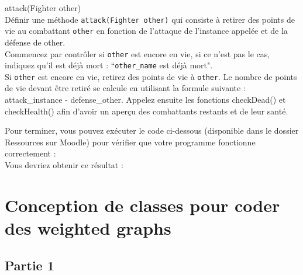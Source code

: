 \begin{Exercice}[10 minutes] attack(Fighter other)\\
    Définir une méthode \lstinline{attack(Fighter other)} qui consiste à retirer des points de vie au combattant \lstinline{other} en fonction de l'attaque de l'instance appelée et de la défense de other. \\
    
    Commencez par contrôler si \lstinline{other} est encore en vie, si ce n'est pas le cas, indiquez qu'il est déjà mort : ``\lstinline{other_name} est déjà mort". \\
    
     Si \lstinline{other} est encore en vie, retirez des points de vie à \lstinline{other}. Le nombre de points de vie devant être retiré se calcule en utilisant la formule suivante : attack\_instance - defense\_other. Appelez ensuite les fonctions checkDead() et checkHealth() afin d'avoir un aperçu des combattants restants et de leur santé.
    


\begin{solution}
	
\end{solution}
\end{Exercice}


Pour terminer, vous pouvez exécuter le code ci-dessous (disponible dans le dossier Ressources sur Moodle) pour vérifier que votre programme fonctionne correctement : \\



Vous devriez obtenir ce résultat : \\



\newpage

\section{Conception de classes pour coder des weighted graphs}

\subsection{Partie 1}

